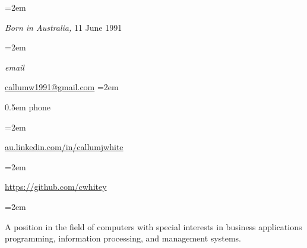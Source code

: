 \documentclass{scrartcl}
\newlength{\datebox}\settowidth{\datebox}{Jan 2011--Dec 2012} %
\newcommand{\NewEntry}[3]{\noindent\hangindent=2em\hangafter=0 \parbox{\datebox}{\small \textit{#1}}\hspace{1.5em} #2 #3 %
\vspace{0.5em}} %
\newcommand{\Description}[1]{\hangindent=2em\hangafter=0\noindent\raggedright\footnotesize{#1}\par\normalsize\vspace{1em}} %
\begin{document}
\thispagestyle{empty} %


\begin{cv}{}\vspace{1.5em} %

\noindent{}\vspace{0.5em} %

\NewEntry{}{\textit{Born in Australia,}}{11 June 1991} %

\NewEntry{email}{\href{mailto:callumw1991@gmail.com}{callumw1991@gmail.com}} %

\NewEntry{phone}{(M) (+61)410110691} %

\vspace{1em} %

\noindent{}\vspace{0.5em}

\Description{\href{au.linkedin.com/in/callumjwhite}{au.linkedin.com/in/callumjwhite}}

\vspace{1em} %

\noindent{}\vspace{0.5em}

\Description{\href{https://github.com/cwhitey}{https://github.com/cwhitey}}

\noindent{}\vspace{1em} %

\Description{A position in the field of computers with special interests in business applications programming, 
			information processing, and management systems.}\vspace{2em} %


\noindent{}\vspace{1em}


\end{cv}
\end{document}
